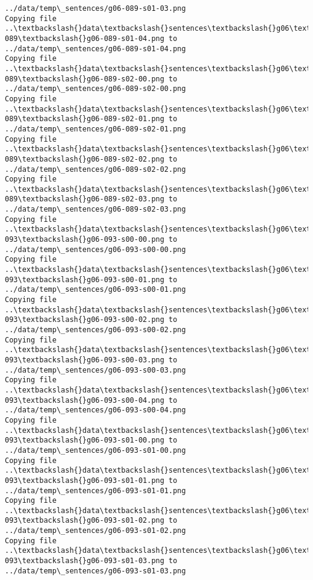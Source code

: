 \documentclass[11pt]{article}
\begin{document}
\begin{Verbatim}[commandchars=\\\{\}]
../data/temp\_sentences/g06-089-s01-03.png
Copying file ..\textbackslash{}data\textbackslash{}sentences\textbackslash{}g06\textbackslash{}g06-089\textbackslash{}g06-089-s01-04.png to
../data/temp\_sentences/g06-089-s01-04.png
Copying file ..\textbackslash{}data\textbackslash{}sentences\textbackslash{}g06\textbackslash{}g06-089\textbackslash{}g06-089-s02-00.png to
../data/temp\_sentences/g06-089-s02-00.png
Copying file ..\textbackslash{}data\textbackslash{}sentences\textbackslash{}g06\textbackslash{}g06-089\textbackslash{}g06-089-s02-01.png to
../data/temp\_sentences/g06-089-s02-01.png
Copying file ..\textbackslash{}data\textbackslash{}sentences\textbackslash{}g06\textbackslash{}g06-089\textbackslash{}g06-089-s02-02.png to
../data/temp\_sentences/g06-089-s02-02.png
Copying file ..\textbackslash{}data\textbackslash{}sentences\textbackslash{}g06\textbackslash{}g06-089\textbackslash{}g06-089-s02-03.png to
../data/temp\_sentences/g06-089-s02-03.png
Copying file ..\textbackslash{}data\textbackslash{}sentences\textbackslash{}g06\textbackslash{}g06-093\textbackslash{}g06-093-s00-00.png to
../data/temp\_sentences/g06-093-s00-00.png
Copying file ..\textbackslash{}data\textbackslash{}sentences\textbackslash{}g06\textbackslash{}g06-093\textbackslash{}g06-093-s00-01.png to
../data/temp\_sentences/g06-093-s00-01.png
Copying file ..\textbackslash{}data\textbackslash{}sentences\textbackslash{}g06\textbackslash{}g06-093\textbackslash{}g06-093-s00-02.png to
../data/temp\_sentences/g06-093-s00-02.png
Copying file ..\textbackslash{}data\textbackslash{}sentences\textbackslash{}g06\textbackslash{}g06-093\textbackslash{}g06-093-s00-03.png to
../data/temp\_sentences/g06-093-s00-03.png
Copying file ..\textbackslash{}data\textbackslash{}sentences\textbackslash{}g06\textbackslash{}g06-093\textbackslash{}g06-093-s00-04.png to
../data/temp\_sentences/g06-093-s00-04.png
Copying file ..\textbackslash{}data\textbackslash{}sentences\textbackslash{}g06\textbackslash{}g06-093\textbackslash{}g06-093-s01-00.png to
../data/temp\_sentences/g06-093-s01-00.png
Copying file ..\textbackslash{}data\textbackslash{}sentences\textbackslash{}g06\textbackslash{}g06-093\textbackslash{}g06-093-s01-01.png to
../data/temp\_sentences/g06-093-s01-01.png
Copying file ..\textbackslash{}data\textbackslash{}sentences\textbackslash{}g06\textbackslash{}g06-093\textbackslash{}g06-093-s01-02.png to
../data/temp\_sentences/g06-093-s01-02.png
Copying file ..\textbackslash{}data\textbackslash{}sentences\textbackslash{}g06\textbackslash{}g06-093\textbackslash{}g06-093-s01-03.png to
../data/temp\_sentences/g06-093-s01-03.png

\end{Verbatim}
\end{document}
